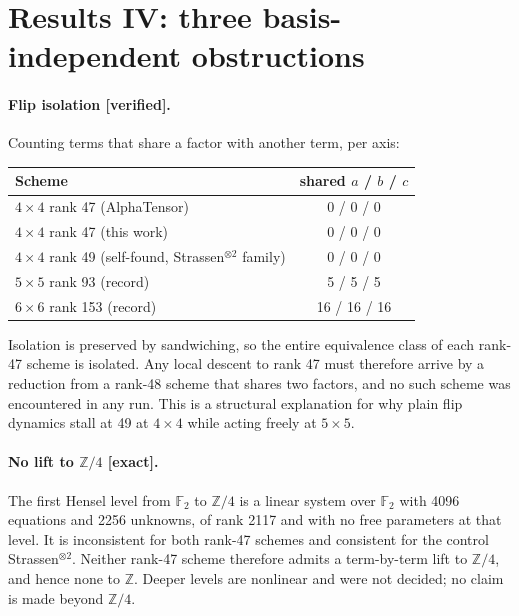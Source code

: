 \documentclass[11pt]{article}
\newcommand{\FF}{\mathbb{F}_2}
\begin{document}
\section{Results IV: three basis-independent obstructions}
\label{sec:obstructions}

\paragraph{Flip isolation [verified].} Counting terms that share a factor with another term, per axis:

\begin{center}
\begin{tabular}{lc}
\toprule
Scheme & shared $a$ / $b$ / $c$ \\
\midrule
$4\times4$ rank 47 (AlphaTensor) & 0 / 0 / 0 \\
$4\times4$ rank 47 (this work) & 0 / 0 / 0 \\
$4\times4$ rank 49 (self-found, Strassen$^{\otimes2}$ family) & 0 / 0 / 0 \\
$5\times5$ rank 93 (record) & 5 / 5 / 5 \\
$6\times6$ rank 153 (record) & 16 / 16 / 16 \\
\bottomrule
\end{tabular}
\end{center}

Isolation is preserved by sandwiching, so the entire equivalence class of each rank-47 scheme is
isolated. Any local descent to rank 47 must therefore arrive by a reduction from a rank-48 scheme that
shares two factors, and no such scheme was encountered in any run. This is a structural explanation for
why plain flip dynamics stall at 49 at $4\times4$ while acting freely at $5\times5$.

\paragraph{No lift to $\mathbb{Z}/4$ [exact].} The first Hensel level from $\FF$ to $\mathbb{Z}/4$ is a
linear system over $\FF$ with 4096 equations and 2256 unknowns, of rank 2117 and with no free parameters
at that level. It is inconsistent for both rank-47 schemes and consistent for the control
Strassen$^{\otimes2}$. Neither rank-47 scheme therefore admits a term-by-term lift to $\mathbb{Z}/4$, and
hence none to $\mathbb{Z}$. Deeper levels are nonlinear and were not decided; no claim is made beyond
$\mathbb{Z}/4$.
\end{document}
